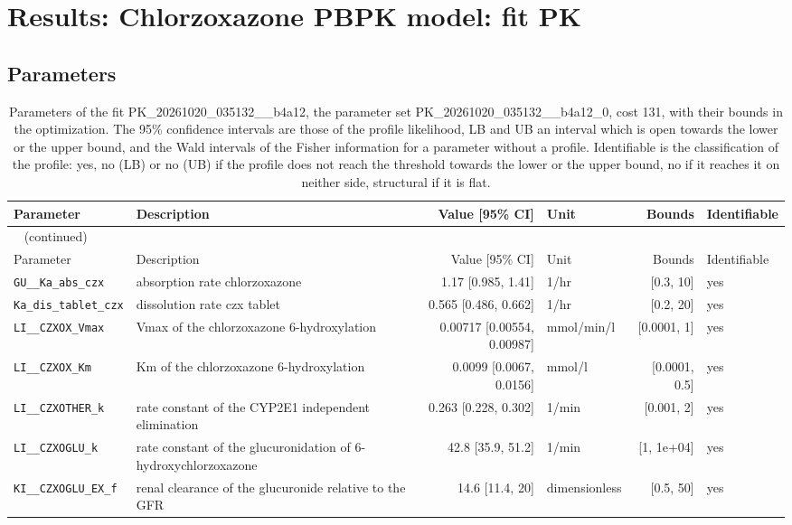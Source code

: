 \documentclass{article}
\begin{document}
\section{Results: Chlorzoxazone PBPK model: fit PK}

\subsection{Parameters}

\begin{longtable}{llrlrl}
\caption{Parameters of the fit PK\_20261020\_035132\_\_b4a12, the parameter set PK\_20261020\_035132\_\_b4a12\_0, cost 131, with their bounds in the optimization. The 95\% confidence intervals are those of the profile likelihood, LB and UB an interval which is open towards the lower or the upper bound, and the Wald intervals of the Fisher information for a parameter without a profile. Identifiable is the classification of the profile: yes, no (LB) or no (UB) if the profile does not reach the threshold towards the lower or the upper bound, no if it reaches it on neither side, structural if it is flat.}\label{tab:parameters:PK_20261020_035132__b4a12} \\
\toprule
Parameter & Description & Value [95\% CI] & Unit & Bounds & Identifiable \\
\midrule
\endfirsthead
\multicolumn{6}{l}{\small\tablename~\thetable{} (continued)} \\
\toprule
Parameter & Description & Value [95\% CI] & Unit & Bounds & Identifiable \\
\midrule
\endhead
\bottomrule
\endlastfoot
\texttt{GU\_\_Ka\_abs\_czx} & absorption rate chlorzoxazone & 1.17 [0.985, 1.41] & 1/hr & [0.3, 10] & yes \\
\texttt{Ka\_dis\_tablet\_czx} & dissolution rate czx tablet & 0.565 [0.486, 0.662] & 1/hr & [0.2, 20] & yes \\
\texttt{LI\_\_CZXOX\_Vmax} & Vmax of the chlorzoxazone 6-hydroxylation & 0.00717 [0.00554, 0.00987] & mmol/min/l & [0.0001, 1] & yes \\
\texttt{LI\_\_CZXOX\_Km} & Km of the chlorzoxazone 6-hydroxylation & 0.0099 [0.0067, 0.0156] & mmol/l & [0.0001, 0.5] & yes \\
\texttt{LI\_\_CZXOTHER\_k} & rate constant of the CYP2E1 independent elimination & 0.263 [0.228, 0.302] & 1/min & [0.001, 2] & yes \\
\texttt{LI\_\_CZXOGLU\_k} & rate constant of the glucuronidation of 6-hydroxychlorzoxazone & 42.8 [35.9, 51.2] & 1/min & [1, 1e+04] & yes \\
\texttt{KI\_\_CZXOGLU\_EX\_f} & renal clearance of the glucuronide relative to the GFR & 14.6 [11.4, 20] & dimensionless & [0.5, 50] & yes \\
\end{longtable}
\end{document}
